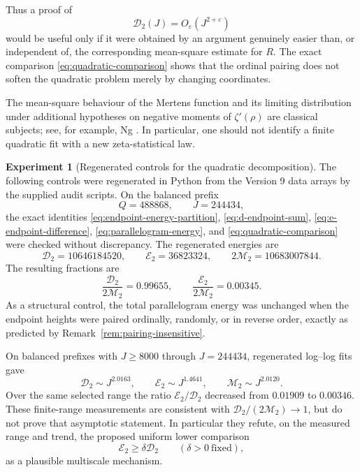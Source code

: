 \documentclass[11pt]{amsart}
\numberwithin{equation}{section}
\theoremstyle{plain}
\theoremstyle{definition}
\newtheorem{experiment}[theorem]{Experiment}
\theoremstyle{remark}
\begin{document}
Thus a proof of
\begin{equation}
\label{eq:D2-target}
\mathcal D_2(J)=O_\varepsilon\!\left(J^{2+\varepsilon}\right)
\end{equation}
would be useful only if it were obtained by an argument genuinely easier than,
or independent of, the corresponding mean-square estimate for $R$.  The exact
comparison \eqref{eq:quadratic-comparison} shows that the ordinal pairing does
not soften the quadratic problem merely by changing coordinates.

The mean-square behaviour of the Mertens function and its limiting
distribution under additional hypotheses on negative moments of
$\zeta'(\rho)$ are classical subjects; see, for example, Ng
\cite{Ng2004}.  In particular, one should not identify a finite quadratic fit
with a new zeta-statistical law.

\begin{experiment}[Regenerated controls for the quadratic decomposition]
\label{exp:v6-quadratic-controls}
The following controls were regenerated in Python from the Version 9 data
arrays by the supplied audit scripts.  On the
balanced prefix
\begin{equation}
\label{eq:v6-balanced-range}
Q=488868,
\qquad
J=244434,
\end{equation}
the exact identities
\eqref{eq:endpoint-energy-partition}, \eqref{eq:d-endpoint-sum},
\eqref{eq:e-endpoint-difference}, \eqref{eq:parallelogram-energy}, and
\eqref{eq:quadratic-comparison} were checked without discrepancy.  The regenerated
energies are
\begin{equation}
\label{eq:v6-energy-values}
\mathcal D_2=10646184520,
\qquad
\mathcal E_2=36823324,
\qquad
2\mathcal M_2=10683007844.
\end{equation}
The resulting fractions are
\begin{equation}
\label{eq:v6-energy-fractions}
\frac{\mathcal D_2}{2\mathcal M_2}=0.99655,
\qquad
\frac{\mathcal E_2}{2\mathcal M_2}=0.00345.
\end{equation}
As a structural control, the total parallelogram energy was unchanged when the
endpoint heights were paired ordinally, randomly, or in reverse order, exactly
as predicted by Remark~\ref{rem:pairing-insensitive}.

On balanced prefixes with $J\ge8000$ through $J=244434$, regenerated log--log
fits gave
\begin{equation}
\label{eq:v6-power-fits}
\mathcal D_2\sim J^{2.0163},
\qquad
\mathcal E_2\sim J^{1.4641},
\qquad
\mathcal M_2\sim J^{2.0120}.
\end{equation}
Over the same selected range the ratio $\mathcal E_2/\mathcal D_2$ decreased
from $0.01909$ to $0.00346$.
These finite-range measurements are consistent with
$\mathcal D_2/(2\mathcal M_2)\to1$, but do not prove that asymptotic statement.
In particular they refute, on the measured range and trend, the proposed
uniform lower comparison
\begin{equation}
\label{eq:false-contraction}
\mathcal E_2\ge\delta\mathcal D_2
\qquad(\delta>0\ \text{fixed}),
\end{equation}
as a plausible multiscale mechanism.
\end{experiment}
\end{document}
